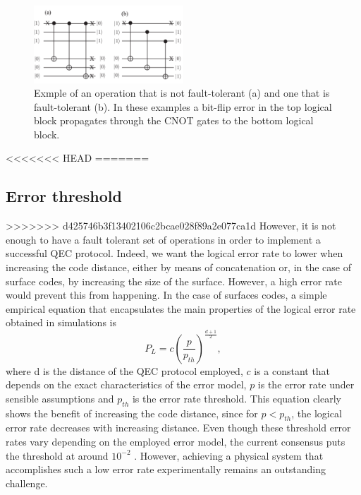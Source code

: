 \begin{figure}[htbp]
  \centering
  \includegraphics[width=0.5\textwidth]{images/fault_tolerance.pdf}
  \caption{Exmple of an operation that is not fault-tolerant (a) and one that is
    fault-tolerant (b). In these examples a bit-flip error in the top logical
    block propagates through the CNOT gates to the bottom logical block.}
  \label{fig:fault_tol}
\end{figure}

<<<<<<< HEAD
=======
\subsection{Error threshold}
>>>>>>> d425746b3f13402106c2bcae028f89a2e077ca1d
However, it is not enough to have a fault tolerant set of operations in order to
implement a successful QEC protocol. Indeed, we want the logical error rate to
lower when increasing the code distance, either by means of concatenation or, in
the case of surface codes, by increasing the size of the surface. However, a high
error rate would prevent this from happening. In the case of surfaces codes, a
simple empirical equation that encapsulates the main properties of the logical
error rate obtained in simulations is
\cite{fowler12_surfac_codes}
\begin{equation}
  \label{eq:1}
  P_L = c\left(\frac{p}{p_{th}}\right)^{\frac{ d+1 }{2}},
\end{equation}
where d is the distance of the QEC protocol employed, $c$ is a constant that
depends on the exact characteristics of the error model, $p$ is the error rate
under sensible assumptions and $p_{th}$ is the error rate threshold. This
equation clearly shows the benefit of increasing the code distance, since for
$p<p_{th}$, the logical error rate decreases with increasing distance. Even
though these threshold error rates vary depending on the employed error model,
the current consensus puts the threshold at around $10^{-2}$ \cite{terhal15}
\cite{Versluis_2017}. However, achieving a physical system that accomplishes
such a low error rate experimentally remains an outstanding challenge.


